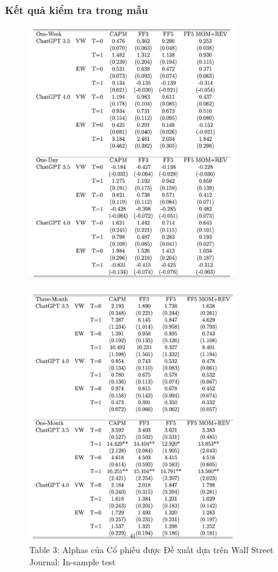 \documentclass[a4paper,12pt]{article}
\begin{document}
\subsubsection{Kết quả kiểm tra trong mẫu}
\begin{figure}[H]
    \centering
    \includegraphics[width=0.8\textwidth]{table/tab3b.png}
    \label{fig:fig2}
\end{figure}
\begin{figure}[H]
    \centering
    \includegraphics[width=0.8\textwidth]{table/tab3a.png}
    \caption*{Table 3: Alphas của Cổ phiếu được Đề xuất dựa trên Wall Street Journal: In-sample test}
    \label{fig:fig2}
\end{figure}
\end{document}
